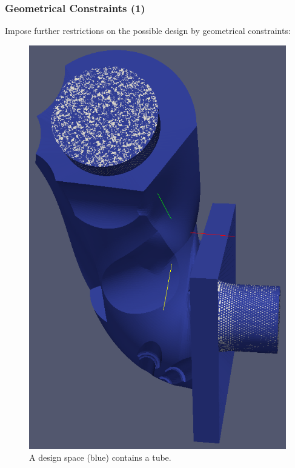 \documentclass[10pt,xcolor=table,english]{beamer}   %
\begin{document}
\begin{frame}
    \frametitle{Geometrical Constraints (1)}
    Impose further restrictions on the possible design by geometrical constraints:
    \begin{figure}
        \includegraphics[scale=0.4]{Geometrical_Constraint_with_Tube}
        \caption{A design space (blue) contains a tube.}
    \end{figure}    
\end{frame}
\end{document}
